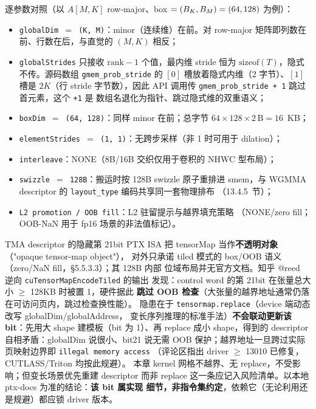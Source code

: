 逐参数对照（以 $A[M, K]$ row-major、box $= (B\sb{K}, B\sb{M}) = (64, 128)$ 为例）：
\begin{itemize}
  \item \texttt{globalDim $=$ (K, M)}：minor（连续维）在前。对 row-major
        矩阵即列数在前、行数在后，与直觉的 $(M, K)$ 相反；
  \item \texttt{global\allowbreak{}Strides} 只接收 $\mathrm{rank} - 1$ 个值，最内维 stride 恒为
        $\mathrm{sizeof}(T)$，隐式不传。源码数组 \texttt{gmem\_\allowbreak{}prob\_\allowbreak{}stride} 的
        $[0]$ 槽放着隐式内维（2 字节）、$[1]$ 槽是 $2K$（行 stride 字节数），因此 API
        调用传 \texttt{gmem\_\allowbreak{}prob\_\allowbreak{}stride + 1} 跳过首元素，这个 \texttt{+1} 是
        数组名退化为指针、跳过隐式维的双重语义；
  \item \texttt{boxDim $=$ (64, 128)}：同样 minor 在前；总字节
        $64 \times 128 \times 2\,\mathrm{B} = 16$~KB；
  \item \texttt{element\allowbreak{}Strides $=\allowbreak{}$ \allowbreak{}(1,\allowbreak{} 1)}：无跨步采样（非 1 时可用于 dilation）；
  \item \texttt{interleave}：NONE（8B/16B 交织仅用于卷积的 NHWC 型布局）；
  \item \texttt{swizzle $=$ 128B}：搬运时按 128B swizzle 原子重排进 smem，与
        WGMMA descriptor 的 \texttt{layout\_type} 编码共享同一套物理排布
        （13.4.5~节）；
  \item \texttt{L2 promotion / OOB fill}：L2 驻留提示与越界填充策略
        （NONE/zero fill；OOB-NaN 用于 fp16 场景的非法值标记）。
\end{itemize}

\begin{kaogu}[F2·社区考据]{TMA descriptor 的隐藏第 21bit}
  PTX ISA 把 tensorMap 当作\textbf{不透明对象}（"opaque tensor-map object"），
  对外只承诺 tiled 模式的 box/OOB 语义（zero/NaN fill，§5.5.3.3）；其 128B 内部
  位域布局并无官方文档。知乎 @reed 逆向 \texttt{cu\allowbreak{}Tensor\allowbreak{}Map\allowbreak{}Encode\allowbreak{}Tiled} 的输出
  发现：control word 的第 21bit 在张量总大小 $\ge$ 128KB 时被置 1，硬件据此
  \textbf{跳过 OOB 检查}（大张量的越界地址通常仍落在可访问页内，跳过检查换性能）。
  隐患在于 \texttt{tensormap.\allowbreak{}replace}（device 端动态改写 globalDim/globalAddress，
  变长序列推理的标准手法）\textbf{不会联动更新该 bit}：先用大 shape 建模板（bit 为
  1）、再 replace 成小 shape，得到的 descriptor 自相矛盾：globalDim 说很小、bit21 说无需
  OOB 保护；越界地址一旦跨过实际页映射边界即 \texttt{illegal memory access}
  （评论区指出 driver $\ge$ 13010 已修复，CUTLASS/Triton 均按此规避）。
  本章 kernel 网格不越界、无 replace，不受影响；但变长场景优先重建 descriptor
  而非 replace 这一条应记入风险清单。以本地 ptx-docs 为准的结论：\textbf{该 bit 属实现
  细节，非指令集约定}，依赖它（无论利用还是规避）都应锁 driver 版本。
\end{kaogu}

